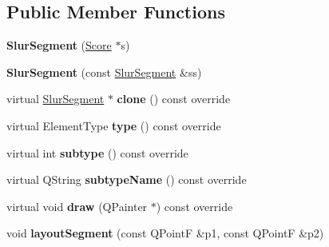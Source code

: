 \subsection*{Public Member Functions}
\begin{DoxyCompactItemize}
\item 
\mbox{\label{class_ms_1_1_slur_segment_a03ec4a43bff2b46c9d65cdccc062790f}} 
{\bfseries Slur\+Segment} (\hyperlink{class_ms_1_1_score}{Score} $\ast$s)
\item 
\mbox{\label{class_ms_1_1_slur_segment_a06add2b24328f81ebd97e18542b91674}} 
{\bfseries Slur\+Segment} (const \hyperlink{class_ms_1_1_slur_segment}{Slur\+Segment} \&ss)
\item 
\mbox{\label{class_ms_1_1_slur_segment_a63fc5cfd5904238255c6e8156e2d22b4}} 
virtual \hyperlink{class_ms_1_1_slur_segment}{Slur\+Segment} $\ast$ {\bfseries clone} () const override
\item 
\mbox{\label{class_ms_1_1_slur_segment_aeac74c81eceda8f0ef324d10f08dd27b}} 
virtual Element\+Type {\bfseries type} () const override
\item 
\mbox{\label{class_ms_1_1_slur_segment_ae6215c3eaee5a9b73fac662dff9fb755}} 
virtual int {\bfseries subtype} () const override
\item 
\mbox{\label{class_ms_1_1_slur_segment_a29eb5ff53461be498216e2fb04a894ba}} 
virtual Q\+String {\bfseries subtype\+Name} () const override
\item 
\mbox{\label{class_ms_1_1_slur_segment_a7a94a0ef4a678f55b7ec254cfbaf14a8}} 
virtual void {\bfseries draw} (Q\+Painter $\ast$) const override
\item 
\mbox{\label{class_ms_1_1_slur_segment_a1d2bc7c27b643c39a1497f6a6a8582f4}} 
void {\bfseries layout\+Segment} (const Q\+PointF \&p1, const Q\+PointF \&p2)
\item 
\mbox{\label{class_ms_1_1_slur_segment_aceb83dad7e96f5a0e29c1512abe9fb10}} 

\end{DoxyCompactItemize}
